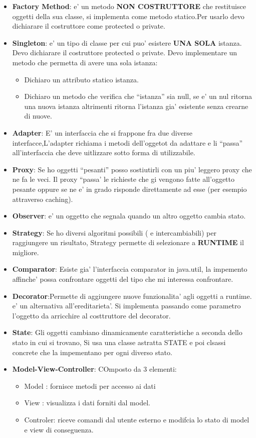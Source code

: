 \documentclass[\main/main.tex]{subfiles}
\begin{document}
\begin{itemize}
\item \textbf{Factory Method}: e' un metodo \textbf{NON COSTRUTTORE} che restituisce oggetti della sua classe, si implementa come metodo statico.Per usarlo devo dichiarare il costruttore come protected o private.
\item \textbf{Singleton}: e' un tipo di classe per cui puo' esistere \textbf{UNA SOLA} istanza. Devo dichiarare il costruttore protected o private. Devo implementare un metodo che permetta di avere una sola istanza:
\begin{itemize}
\item Dichiaro un attributo statico istanza.
\item Dichiaro un metodo che verifica che ``istanza'' sia null, se e' un nul ritorna una nuova istanza altrimenti ritorna l'istanza gia' esistente senza crearne di nuove.
\end{itemize}
\item \textbf{Adapter}:
E' un interfaccia che si frappone fra due diverse interfacce,L'adapter richiama i metodi dell'oggetot da adattare e li ``passa'' all'interfaccia che deve uitlizzare sotto forma di utilizzabile.
\item \textbf{Proxy}: Se ho oggetti ``pesanti'' posso sostiutirli con un piu' leggero proxy che ne fa le veci. Il proxy ``passa' le richieste che gi vengono fatte all'oggetto pesante oppure se ne e' in grado risponde direttamente ad esse (per esempio attraverso caching).
\item \textbf{Observer}: e' un oggetto che segnala quando un altro oggetto cambia stato.
\item \textbf{Strategy}: Se ho diversi algoritmi possibili ( e intercambiabili) per raggiungere  un risultato, Strategy permette di selezionare a \textbf{RUNTIME} il migliore.
\item \textbf{Comparator}: Esiste gia' l'interfaccia comparator in java.util, la impemento affinche' possa confrontare oggetti del tipo che mi interessa confrontare.
\item \textbf{Decorator}:Permette di aggiungere nuove funzionalita' agli oggetti a runtime. e' un alternativa all'ereditarieta'. Si implementa passando come parametro l'oggetto da arricchire al costtruttore del decorator.
\item \textbf{State}: Gli oggetti cambiano dinamicamente caratteristiche a seconda dello stato in cui si trovano, Si usa una classe astratta STATE e poi clsassi concrete che la impementano per ogni diverso stato.
\item\textbf{Model-View-Controller}: COmposto da 3 elementi:
\begin{itemize}
\item Model : fornisce metodi per accesso ai dati
\item View  : visualizza i dati forniti dal model.
\item Controler: riceve comandi dal utente esterno e modifcia lo stato di model e view di conseguenza.
\end{itemize}
\end{itemize}
\end{document}
